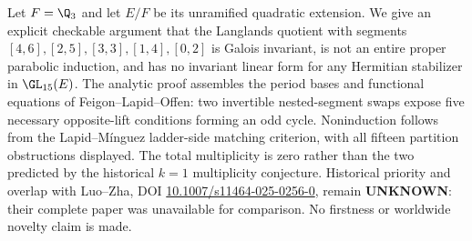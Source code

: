 Let $F=\Q_3$ and let $E/F$ be its unramified quadratic extension. We give an explicit checkable argument that the Langlands quotient with segments
$[4,6],[2,5],[3,3],[1,4],[0,2]$ is Galois invariant, is not an entire proper parabolic induction, and has no invariant linear form for any Hermitian stabilizer in $\GL_{15}(E)$. The analytic proof assembles the period bases and functional equations of Feigon--Lapid--Offen: two invertible nested-segment swaps expose five necessary opposite-lift conditions forming an odd cycle. Noninduction follows from the Lapid--M\'inguez ladder-side matching criterion, with all fifteen partition obstructions displayed. The total multiplicity is zero rather than the two predicted by the historical $k=1$ multiplicity conjecture. Historical priority and overlap with Luo--Zha, DOI \href{https://doi.org/10.1007/s11464-025-0256-0}{10.1007/s11464-025-0256-0}, remain \textbf{UNKNOWN}: their complete paper was unavailable for comparison. No firstness or worldwide novelty claim is made.
